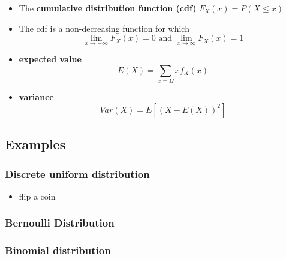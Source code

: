 \documentclass[
  letterpaper,
  DIV=11,
  numbers=noendperiod]{scrreprt}
\providecommand{\tightlist}{%
  \setlength{\itemsep}{0pt}\setlength{\parskip}{0pt}}\usepackage{longtable,booktabs,array}
\begin{document}
\begin{itemize}
\tightlist
\item
  The \textbf{cumulative distribution function (cdf)}
  \(F_X(x) = P(X ≤ x)\)
\end{itemize}

\begin{figure}


\caption{\label{fig-coin\_cdf}}

\end{figure}%

\begin{itemize}
\tightlist
\item
  The cdf is a non-decreasing function for which
  \[\lim_{x\to - \infty} F_X(x) = 0 \text{  and } \lim_{x\to \infty} F_X(x) =1 \]
\item
  \textbf{expected value} \[E(X) = \sum_{x=\Omega} xf_X(x)\]
\item
  \textbf{variance} \[Var(X) = E[(X-E(X))^2]\]
\end{itemize}

\subsection{Examples}\label{examples}

\subsubsection{Discrete uniform
distribution}\label{discrete-uniform-distribution}

\begin{itemize}
\tightlist
\item
  flip a coin
\end{itemize}

\subsubsection{Bernoulli Distribution}\label{bernoulli-distribution}

\subsubsection{Binomial distribution}\label{binomial-distribution}
\end{document}
